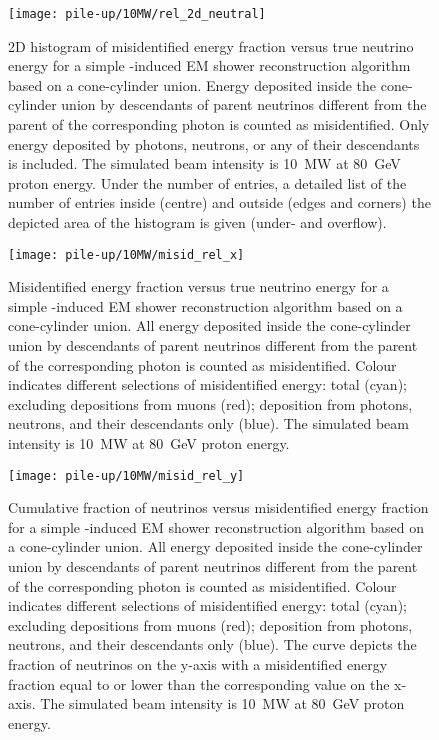 \begin{figure}[htb]
	\centering
	\texttt{[image: pile-up/10MW/rel\_2d\_neutral]}
	\caption{2D histogram of misidentified energy fraction versus true neutrino energy for a simple \Pgpz-induced EM shower reconstruction algorithm based on a cone-cylinder union.
		Energy deposited inside the cone-cylinder union by descendants of parent neutrinos different from the parent of the corresponding \Pgpz photon is counted as misidentified.
		Only energy deposited by photons, neutrons, or any of their descendants is included.
		The simulated beam intensity is \SI{10}{\mega\watt} at \SI{80}{\giga\electronvolt} proton energy.
		Under the number of entries, a detailed list of the number of entries inside (centre) and outside (edges and corners) the depicted area of the histogram is given (under- and overflow).}
\end{figure}

\begin{figure}[htb]
	\centering
	\texttt{[image: pile-up/10MW/misid\_rel\_x]}
	\caption{Misidentified energy fraction versus true neutrino energy for a simple \Pgpz-induced EM shower reconstruction algorithm based on a cone-cylinder union.
		All energy deposited inside the cone-cylinder union by descendants of parent neutrinos different from the parent of the corresponding \Pgpz photon is counted as misidentified.
		Colour indicates different selections of misidentified energy: total (cyan); excluding depositions from muons (red); deposition from photons, neutrons, and their descendants only (blue).
		The simulated beam intensity is \SI{10}{\mega\watt} at \SI{80}{\giga\electronvolt} proton energy.}
\end{figure}

\begin{figure}[htb]
	\centering
	\texttt{[image: pile-up/10MW/misid\_rel\_y]}
	\caption{Cumulative fraction of neutrinos versus misidentified energy fraction for a simple \Pgpz-induced EM shower reconstruction algorithm based on a cone-cylinder union.
		All energy deposited inside the cone-cylinder union by descendants of parent neutrinos different from the parent of the corresponding \Pgpz photon is counted as misidentified.
		Colour indicates different selections of misidentified energy: total (cyan); excluding depositions from muons (red); deposition from photons, neutrons, and their descendants only (blue).
		The curve depicts the fraction of neutrinos on the y-axis with a misidentified energy fraction equal to or lower than the corresponding value on the x-axis.
		The simulated beam intensity is \SI{10}{\mega\watt} at \SI{80}{\giga\electronvolt} proton energy.}
\end{figure}